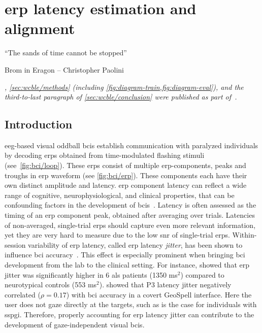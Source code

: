 \chapter{\Acs{erp} latency estimation and alignment}
\label{sec:wcble}
\epigraph{``The sands of time cannot be stopped''}{Brom in Eragon --
Christopher Paolini}
\noindent\emph{, \cref{sec:wcble/methods} (including
\cref{fig:diagram-train,fig:diagram-eval}), and the third-to-last paragraph of
\cref{sec:wcble/conclusion} were published
as part of~\textcite{VanDenKerchove2024}.}

\section{Introduction}
\label{sec:wcble/intro}

\Ac{eeg}-based visual oddball \acp{bci} establish communication with paralyzed
individuals by decoding \acp{erp} obtained from time-modulated flashing
stimuli (see~\cref{fig:bci/loop}).
These \acp{erp} consist of multiple \ac{erp}-components, peaks and troughs in
\ac{erp} waveform (see \cref{fig:bci/erp}).
These components each have their own distinct amplitude and latency.
\Ac{erp} component latency can reflect a wide range of cognitive,
neurophysiological, and clinical properties, that can be confounding factors in
the development of \acp{bci}~\cite{Luck2014}.
Latency is often assessed as the timing of an \ac{erp} component peak, obtained
after averaging over trials.
Latencies of non-averaged, single-trial \acp{erp} should capture even more
relevant information, yet they are very hard to measure due to the low \ac{snr} of
single-trial \acp{erp}.
Within-session variability of \ac{erp} latency, called \ac{erp} latency
\emph{jitter}, has been shown to influence \ac{bci}
accuracy~\cite{Thompson2012}.
This effect is especially prominent when bringing \ac{bci} development from the
lab to the clinical setting.
For instance, \textcite{Zisk2021} showed that \ac{erp} jitter was significantly higher
in 6 \ac{als} patients (1350 ms$^2$) compared to neurotypical controls
(553 ms$^2$).
\textcite{Arico2014} showed that P3 latency jitter negatively correlated
($\rho=0.17$) with \ac{bci} accuracy in a covert GeoSpell interface.
Here the user does not gaze directly at the targets, such as is
the case for individuals with \ac{sspgi}.
Therefore, properly accounting for \ac{erp} latency jitter can contribute to
the development of gaze-independent visual \acp{bci}.


